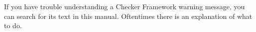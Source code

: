 If you have trouble understanding a Checker Framework warning message, you
can search for its text in this manual.
Oftentimes there is an explanation of what to do.


